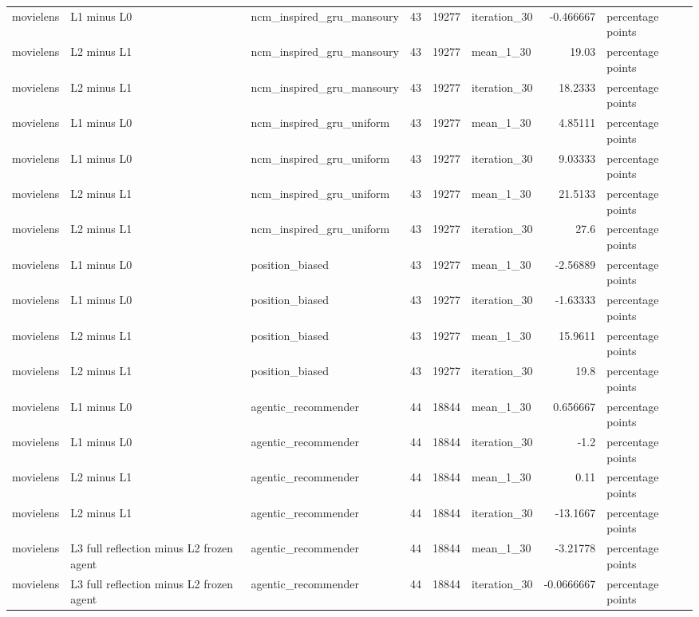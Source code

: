 \begin{table}[htbp!]
\begin{tabular}{lllrrlrl}
movielens & L1 minus L0 & ncm\_inspired\_gru\_mansoury & 43 & 19277 & iteration\_30 & -0.466667 & percentage points \\
movielens & L2 minus L1 & ncm\_inspired\_gru\_mansoury & 43 & 19277 & mean\_1\_30 & 19.03 & percentage points \\
movielens & L2 minus L1 & ncm\_inspired\_gru\_mansoury & 43 & 19277 & iteration\_30 & 18.2333 & percentage points \\
movielens & L1 minus L0 & ncm\_inspired\_gru\_uniform & 43 & 19277 & mean\_1\_30 & 4.85111 & percentage points \\
movielens & L1 minus L0 & ncm\_inspired\_gru\_uniform & 43 & 19277 & iteration\_30 & 9.03333 & percentage points \\
movielens & L2 minus L1 & ncm\_inspired\_gru\_uniform & 43 & 19277 & mean\_1\_30 & 21.5133 & percentage points \\
movielens & L2 minus L1 & ncm\_inspired\_gru\_uniform & 43 & 19277 & iteration\_30 & 27.6 & percentage points \\
movielens & L1 minus L0 & position\_biased & 43 & 19277 & mean\_1\_30 & -2.56889 & percentage points \\
movielens & L1 minus L0 & position\_biased & 43 & 19277 & iteration\_30 & -1.63333 & percentage points \\
movielens & L2 minus L1 & position\_biased & 43 & 19277 & mean\_1\_30 & 15.9611 & percentage points \\
movielens & L2 minus L1 & position\_biased & 43 & 19277 & iteration\_30 & 19.8 & percentage points \\
movielens & L1 minus L0 & agentic\_recommender & 44 & 18844 & mean\_1\_30 & 0.656667 & percentage points \\
movielens & L1 minus L0 & agentic\_recommender & 44 & 18844 & iteration\_30 & -1.2 & percentage points \\
movielens & L2 minus L1 & agentic\_recommender & 44 & 18844 & mean\_1\_30 & 0.11 & percentage points \\
movielens & L2 minus L1 & agentic\_recommender & 44 & 18844 & iteration\_30 & -13.1667 & percentage points \\
movielens & L3 full reflection minus L2 frozen agent & agentic\_recommender & 44 & 18844 & mean\_1\_30 & -3.21778 & percentage points \\
movielens & L3 full reflection minus L2 frozen agent & agentic\_recommender & 44 & 18844 & iteration\_30 & -0.0666667 & percentage points \\

\end{tabular}
\end{table}
